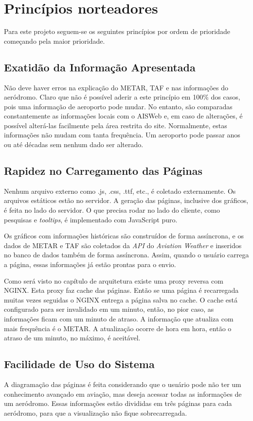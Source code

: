 \chapter{Princípios norteadores}

Para este projeto seguem-se os seguintes princípios por ordem de prioridade começando
pela maior prioridade.

\section{Exatidão da Informação Apresentada}
Não deve haver erros na explicação do METAR, TAF e nas informações do aeródromo. 
Claro que não é possível aderir a este princípio em 100\% dos casos, pois uma 
informação de aeroporto pode mudar. No entanto, são comparadas constantemente as 
informações locais com o AISWeb e, em caso de alterações, é possível alterá-las 
facilmente pela área restrita do site. Normalmente, estas informações não 
mudam com tanta frequência. Um aeroporto pode passar anos ou até décadas sem
nenhum dado ser alterado.

\section{Rapidez no Carregamento das Páginas} Nenhum arquivo externo como .js, 
.css, .ttf, etc., é coletado externamente. Os arquivos estáticos estão no servidor. 
A geração das páginas, inclusive dos gráficos, é feita no lado do servidor. O que 
precisa rodar no lado do cliente, como pesquisas e \textit{tooltips}, é implementado com 
JavaScript puro.

Os gráficos com informações históricas são construídos de forma assíncrona, e os
dados de METAR e TAF são coletados da \textit{API} do \textit{Aviation Weather} e inseridos no
banco de dados também de forma assíncrona. Assim, quando o usuário carrega a 
página, essas informações já estão prontas para o envio.

Como será visto no capítulo de arquitetura existe uma proxy reversa com NGINX.
Esta proxy faz cache das páginas. Então se uma página é recarregada muitas vezes
seguidas o NGINX entrega a página salva no cache. O cache está configurado para
ser invalidado em um minuto, então, no pior caso, as informações ficam com um 
minuto de atraso. A informação que atualiza com mais frequência é o METAR. A
atualização ocorre de hora em hora, então o atraso de um minuto, no máximo, é
aceitável.

\section{Facilidade de Uso do Sistema} A diagramação das páginas é feita
considerando que o usuário pode não ter um conhecimento avançado em aviação, mas
deseja acessar todas as informações de um aeródromo. Essas informações estão 
divididas em três páginas para cada aeródromo, para que a visualização não fique 
sobrecarregada.